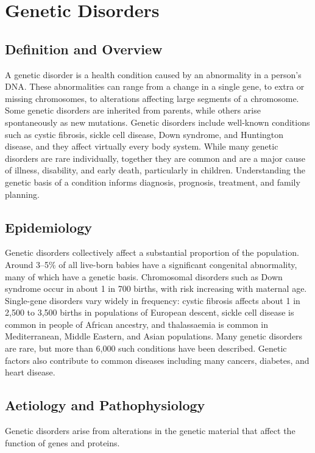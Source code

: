 \chapter{Genetic Disorders}

\section*{Definition and Overview}
A genetic disorder is a health condition caused by an abnormality in a person's DNA. These abnormalities can range from a change in a single gene, to extra or missing chromosomes, to alterations affecting large segments of a chromosome. Some genetic disorders are inherited from parents, while others arise spontaneously as new mutations. Genetic disorders include well-known conditions such as cystic fibrosis, sickle cell disease, Down syndrome, and Huntington disease, and they affect virtually every body system. While many genetic disorders are rare individually, together they are common and are a major cause of illness, disability, and early death, particularly in children. Understanding the genetic basis of a condition informs diagnosis, prognosis, treatment, and family planning.

\section*{Epidemiology}
Genetic disorders collectively affect a substantial proportion of the population. Around 3--5\% of all live-born babies have a significant congenital abnormality, many of which have a genetic basis. Chromosomal disorders such as Down syndrome occur in about 1 in 700 births, with risk increasing with maternal age. Single-gene disorders vary widely in frequency: cystic fibrosis affects about 1 in 2,500 to 3,500 births in populations of European descent, sickle cell disease is common in people of African ancestry, and thalassaemia is common in Mediterranean, Middle Eastern, and Asian populations. Many genetic disorders are rare, but more than 6,000 such conditions have been described. Genetic factors also contribute to common diseases including many cancers, diabetes, and heart disease.

\section*{Aetiology and Pathophysiology}
Genetic disorders arise from alterations in the genetic material that affect the function of genes and proteins.

